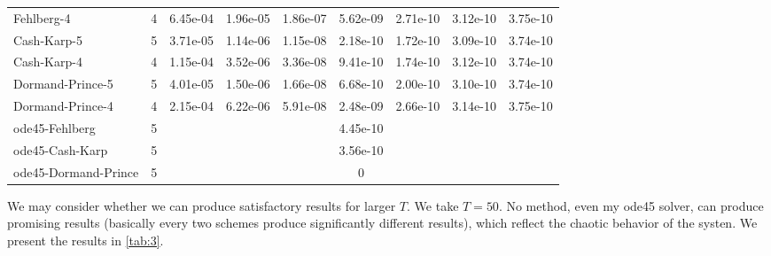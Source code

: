 \documentclass[conference,onecolumn,12pt]{IEEEtran}
\begin{document}
\begin{table}[htbp]
{\begin{tabular}{lrccccccc}
    Fehlberg-4 & 4     & \multicolumn{1}{r}{6.45e-04} & \multicolumn{1}{r}{1.96e-05} & \multicolumn{1}{r}{1.86e-07} & \multicolumn{1}{r}{5.62e-09} & \multicolumn{1}{r}{2.71e-10} & \multicolumn{1}{r}{3.12e-10} & \multicolumn{1}{r}{3.75e-10} \\
    Cash-Karp-5 & 5     & \multicolumn{1}{r}{3.71e-05} & \multicolumn{1}{r}{1.14e-06} & \multicolumn{1}{r}{1.15e-08} & \multicolumn{1}{r}{2.18e-10} & \multicolumn{1}{r}{1.72e-10} & \multicolumn{1}{r}{3.09e-10} & \multicolumn{1}{r}{3.74e-10} \\
    Cash-Karp-4 & 4     & \multicolumn{1}{r}{1.15e-04} & \multicolumn{1}{r}{3.52e-06} & \multicolumn{1}{r}{3.36e-08} & \multicolumn{1}{r}{9.41e-10} & \multicolumn{1}{r}{1.74e-10} & \multicolumn{1}{r}{3.12e-10} & \multicolumn{1}{r}{3.74e-10} \\
    Dormand-Prince-5 & 5     & \multicolumn{1}{r}{4.01e-05} & \multicolumn{1}{r}{1.50e-06} & \multicolumn{1}{r}{1.66e-08} & \multicolumn{1}{r}{6.68e-10} & \multicolumn{1}{r}{2.00e-10} & \multicolumn{1}{r}{3.10e-10} & \multicolumn{1}{r}{3.74e-10} \\
    Dormand-Prince-4 & 4     & \multicolumn{1}{r}{2.15e-04} & \multicolumn{1}{r}{6.22e-06} & \multicolumn{1}{r}{5.91e-08} & \multicolumn{1}{r}{2.48e-09} & \multicolumn{1}{r}{2.66e-10} & \multicolumn{1}{r}{3.14e-10} & \multicolumn{1}{r}{3.75e-10} \\
    ode45-Fehlberg & 5     & \multicolumn{7}{c}{4.45e-10} \\
    ode45-Cash-Karp & 5     & \multicolumn{7}{c}{3.56e-10} \\
    ode45-Dormand-Prince & 5     & \multicolumn{7}{c}{0} \\
    \bottomrule
    \end{tabular}
  }
  \label{tab:2}%
\end{table}%


We may consider whether we can produce satisfactory results for larger $T$. We take $T=50$. No method, even my ode45 solver, can produce promising results (basically every two schemes produce significantly different results), which reflect the chaotic behavior of the systen. We present the results in \ref{tab:3}.
\end{document}
